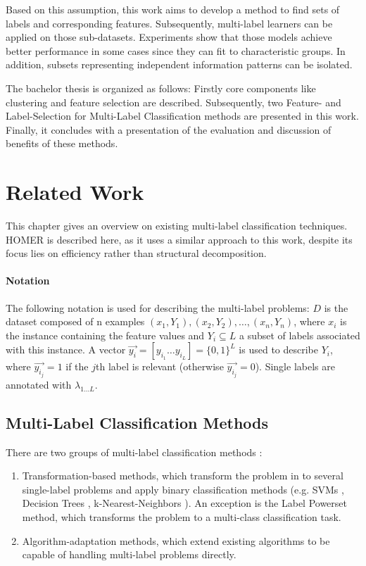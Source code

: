 		Based on this assumption, this work aims to develop a method to find sets of labels and corresponding features. Subsequently, multi-label learners can be applied on those sub-datasets. Experiments show that those models achieve better performance in some cases since they can fit to characteristic groups. In addition, subsets representing independent information patterns can be isolated.

		The bachelor thesis is organized as follows: Firstly core components like clustering and feature selection are described. Subsequently, two Feature- and Label-Selection for Multi-Label Classification methods are presented in this work. Finally, it concludes with a presentation of the evaluation and discussion of benefits of these methods.

	\section{Related Work}
	\label{sec:relatedwork}

		This chapter gives an overview on existing multi-label classification techniques. HOMER is described here, as it uses a similar approach to this work, despite its focus lies on efficiency rather than structural decomposition. 
		
		\paragraph{Notation} The following notation is used for describing the multi-label problems: $ D $ is the dataset composed of n examples $ (x_1,Y_1), (x_2,Y_2), \hdots, (x_n,Y_n) $, where $ x_i $ is the instance containing the feature values and $ Y_i \subseteq L $ a subset of labels associated with this instance. A vector $\vec{y_i} = [y_{i_1}\hdots y_{i_L}] = \{0,1\}^L$ is used to describe $Y_i$, where $\vec{y_{i_j}}=1$ if the $j$th label is relevant (otherwise  $\vec{y_{i_j}}=0$). Single labels are annotated with $\lambda_{1\hdots L}$.

			\subsection{Multi-Label Classification Methods}
			\label{subsec:mlmethods}
				There are two groups of multi-label classification methods \cite{Tsoumakas07}:
				\begin{enumerate}
					\item Transformation-based methods, which transform the problem in to several single-label problems and apply binary classification methods (e.g. SVMs \cite{SVM}, Decision Trees \cite{Quinlan1986}, k-Nearest-Neighbors \cite{mitchell97}). An exception is the Label Powerset method, which transforms the problem to a multi-class classification task. 
					\item Algorithm-adaptation methods, which extend existing algorithms to be capable of handling multi-label problems directly.
				\end{enumerate}
				
